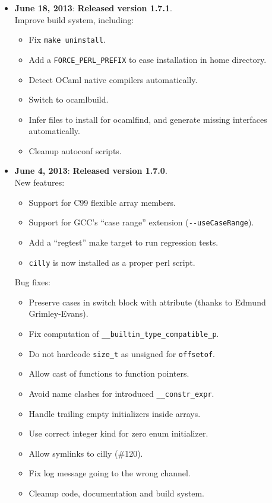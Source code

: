 \documentclass[letterpaper]{article}
\begin{document}
\begin{itemize}
\item{\bf June 18, 2013}: {\bf Released version 1.7.1}.\\
Improve build system, including:
    \begin{itemize}
      \item Fix \texttt{make uninstall}.
      \item Add a \verb|FORCE_PERL_PREFIX| to ease installation
        in home directory.
      \item Detect OCaml native compilers automatically.
      \item Switch to ocamlbuild.
      \item Infer files to install for ocamlfind, and generate missing
        interfaces automatically.
      \item Cleanup autoconf scripts.
    \end{itemize}

\item{\bf June 4, 2013}: {\bf Released version 1.7.0}.\\
    New features:
    \begin{itemize}
      \item Support for C99 flexible array members.
      \item Support for GCC's ``case range'' extension (\verb|--useCaseRange|).
      \item Add a ``regtest'' make target to run regression tests.
      \item \texttt{cilly} is now installed as a proper perl script.
    \end{itemize}
    Bug fixes:
    \begin{itemize}
      \item Preserve cases in switch block with attribute (thanks to Edmund Grimley-Evans).
      \item Fix computation of \verb|__builtin_type_compatible_p|.
      \item Do not hardcode \verb|size_t| as unsigned for \verb|offsetof|.
      \item Allow cast of functions to function pointers.
      \item Avoid name clashes for introduced \verb|__constr_expr|.
      \item Handle trailing empty initializers inside arrays.
      \item Use correct integer kind for zero enum initializer.
      \item Allow symlinks to cilly (\#120).
      \item Fix log message going to the wrong channel.
      \item Cleanup code, documentation and build system.
    \end{itemize}


\end{itemize}
\end{document}
